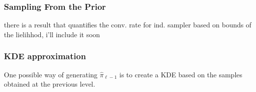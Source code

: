 \begin{proposition}
%	
	
\end{proposition}	
\subsubsection{Sampling From the Prior}
\color{red}there is a result that quantifies the conv. rate for ind. sampler based on bounds of the lielihhod, i'll include it soon \color{black}
\subsubsection{KDE approximation}
One possible way of generating $\hat{\pi}_{\ell-1}$ is to create a KDE based on the samples obtained at the previous level. 
